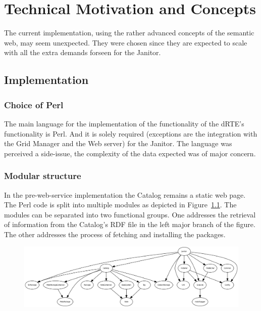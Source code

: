 \chapter{Technical Motivation and Concepts}

The current implementation, using the rather advanced concepts of the
semantic web, may seem unexpected. They were chosen since they are expected
to scale with all the extra demands forseen for the Janitor.

\section{Implementation}

\subsection{Choice of Perl}

 The main language for the implementation of the functionality of the
 dRTE's functionality is Perl. And it is solely required (exceptions are the
 integration with the Grid Manager and the Web server) for the Janitor.
 The language was perceived a side-issue, the complexity of the data
 expected was of major concern. 

\subsection{Modular structure}

 In
 the pre-web-service implementation the Catalog remains a static web page.
 The Perl code is split into multiple modules as depicted in Figure~\ref{fig:janitorDependencies}. 
 The modules can be separated into two
 functional groups. One addresses the retrieval of information from
 the Catalog's RDF file in the left major branch of the figure. The other
 addresses the process of fetching and installing the packages.

 \begin{landscape}
\begin{figure}[!h]
\vspace{4cm}
 \begin{center} 
    \includegraphics[width=24cm]{images/dependencies.png}
 \end{center} 
\vfill
 \label{fig:janitorDependencies} 
\end{figure}
 \end{landscape}

